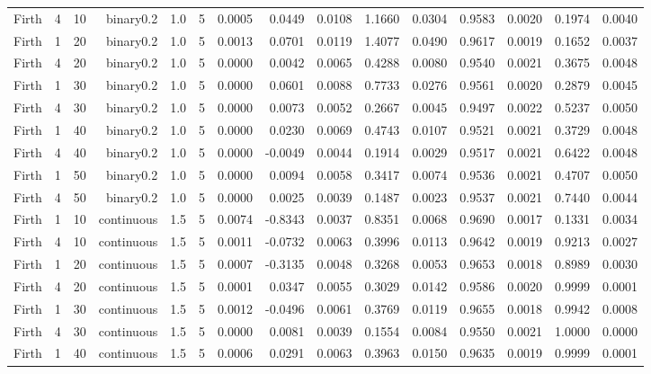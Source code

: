 \begin{longtable}{rrrrrrrrrrrrrrr}
  Firth & 4 & 10 & binary0.2 & 1.0 & 5 & 0.0005 & 0.0449 & 0.0108 & 1.1660 & 0.0304 & 0.9583 & 0.0020 & 0.1974 & 0.0040 \\ 
  Firth & 1 & 20 & binary0.2 & 1.0 & 5 & 0.0013 & 0.0701 & 0.0119 & 1.4077 & 0.0490 & 0.9617 & 0.0019 & 0.1652 & 0.0037 \\ 
  Firth & 4 & 20 & binary0.2 & 1.0 & 5 & 0.0000 & 0.0042 & 0.0065 & 0.4288 & 0.0080 & 0.9540 & 0.0021 & 0.3675 & 0.0048 \\ 
  Firth & 1 & 30 & binary0.2 & 1.0 & 5 & 0.0000 & 0.0601 & 0.0088 & 0.7733 & 0.0276 & 0.9561 & 0.0020 & 0.2879 & 0.0045 \\ 
  Firth & 4 & 30 & binary0.2 & 1.0 & 5 & 0.0000 & 0.0073 & 0.0052 & 0.2667 & 0.0045 & 0.9497 & 0.0022 & 0.5237 & 0.0050 \\ 
  Firth & 1 & 40 & binary0.2 & 1.0 & 5 & 0.0000 & 0.0230 & 0.0069 & 0.4743 & 0.0107 & 0.9521 & 0.0021 & 0.3729 & 0.0048 \\ 
  Firth & 4 & 40 & binary0.2 & 1.0 & 5 & 0.0000 & -0.0049 & 0.0044 & 0.1914 & 0.0029 & 0.9517 & 0.0021 & 0.6422 & 0.0048 \\ 
  Firth & 1 & 50 & binary0.2 & 1.0 & 5 & 0.0000 & 0.0094 & 0.0058 & 0.3417 & 0.0074 & 0.9536 & 0.0021 & 0.4707 & 0.0050 \\ 
  Firth & 4 & 50 & binary0.2 & 1.0 & 5 & 0.0000 & 0.0025 & 0.0039 & 0.1487 & 0.0023 & 0.9537 & 0.0021 & 0.7440 & 0.0044 \\ 
  Firth & 1 & 10 & continuous & 1.5 & 5 & 0.0074 & -0.8343 & 0.0037 & 0.8351 & 0.0068 & 0.9690 & 0.0017 & 0.1331 & 0.0034 \\ 
  Firth & 4 & 10 & continuous & 1.5 & 5 & 0.0011 & -0.0732 & 0.0063 & 0.3996 & 0.0113 & 0.9642 & 0.0019 & 0.9213 & 0.0027 \\ 
  Firth & 1 & 20 & continuous & 1.5 & 5 & 0.0007 & -0.3135 & 0.0048 & 0.3268 & 0.0053 & 0.9653 & 0.0018 & 0.8989 & 0.0030 \\ 
  Firth & 4 & 20 & continuous & 1.5 & 5 & 0.0001 & 0.0347 & 0.0055 & 0.3029 & 0.0142 & 0.9586 & 0.0020 & 0.9999 & 0.0001 \\ 
  Firth & 1 & 30 & continuous & 1.5 & 5 & 0.0012 & -0.0496 & 0.0061 & 0.3769 & 0.0119 & 0.9655 & 0.0018 & 0.9942 & 0.0008 \\ 
  Firth & 4 & 30 & continuous & 1.5 & 5 & 0.0000 & 0.0081 & 0.0039 & 0.1554 & 0.0084 & 0.9550 & 0.0021 & 1.0000 & 0.0000 \\ 
  Firth & 1 & 40 & continuous & 1.5 & 5 & 0.0006 & 0.0291 & 0.0063 & 0.3963 & 0.0150 & 0.9635 & 0.0019 & 0.9999 & 0.0001 \\ 

\end{longtable}
